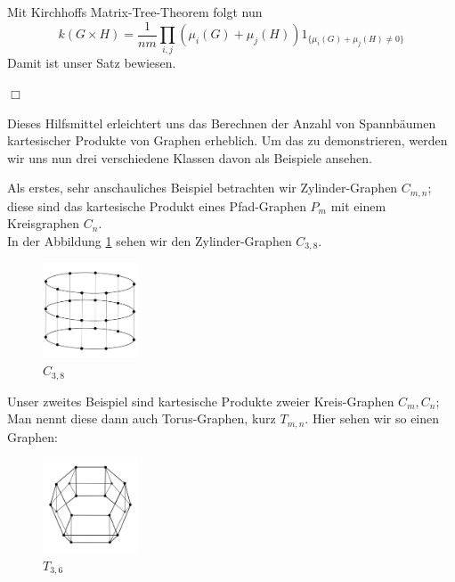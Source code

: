 Mit Kirchhoffs Matrix-Tree-Theorem folgt nun
\begin{equation}
 \mathit{k}(G \times H) = \frac{1}{nm}\displaystyle\prod_{i,j}(\mu_i(G)+\mu_j(H))1_{\{\mu_i(G)+\mu_j(H)\neq0\}}
\end{equation}
Damit ist unser Satz bewiesen.
\begin{flushright} $\Box$ \end{flushright} 
Dieses Hilfsmittel erleichtert uns das Berechnen der Anzahl von Spannbäumen kartesischer Produkte von Graphen erheblich. Um das zu demonstrieren, werden wir uns nun drei verschiedene Klassen davon als Beispiele ansehen.

\begin{Bsps}
\end{Bsps}
Als erstes, sehr anschauliches Beispiel betrachten wir Zylinder-Graphen $C_{m,n}$;
diese sind das kartesische Produkt eines Pfad-Graphen $P_m$ mit einem Kreisgraphen $C_n$.\\
In der Abbildung \ref{c8xp3} sehen wir den Zylinder-Graphen $C_{3,8}$.
\begin{figure}[H]
  \centering
 \includegraphics[width=0.25\textwidth]{c8xp3.png}
 \caption{$C_{3,8}$}
 \label{c8xp3} %
\end{figure}
\begin{Bsps}
\end{Bsps}
Unser zweites Beispiel sind kartesische Produkte zweier Kreis-Graphen $C_m,C_n$; Man nennt diese dann auch Torus-Graphen, kurz $T_{m,n}$. Hier sehen wir so einen Graphen:
\begin{figure}[H]
  \centering
 \includegraphics[width=0.25\textwidth]{C3xC6_4.png}
 \caption{$T_{3,6}$}
 \label{c3xc6} %
\end{figure}
